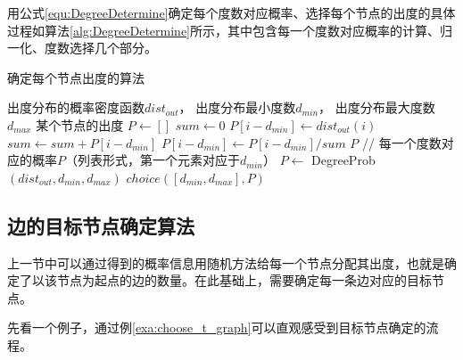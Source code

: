 用公式\ref{equ:DegreeDetermine}确定每个度数对应概率、选择每个节点的出度的具体过程如算法\ref{alg:DegreeDetermine}所示，其中包含每一个度数对应概率的计算、归一化、度数选择几个部分。

% 

\begin{algorithm}[htb]
  \caption{确定每个节点出度的算法}
  \label{alg:DegreeDetermine}
  \begin{algorithmic}[1]
    \Require
      出度分布的概率密度函数$dist_{out}$，
      出度分布最小度数$d_{min}$，
      出度分布最大度数$d_{max}$
    \Ensure 某个节点的出度
      \State $P \gets []$
      \State $sum \gets 0$
        \State $P[i - d_{min}] \gets dist_{out}(i)$
        \State $sum \gets sum + P[i - d_{min}]$
      \EndFor
        \State $P[i - d_{min}] \gets P[i - d_{min}] / sum$
      \EndFor
      \State \Return $P$ // 每一个度数对应的概率$P$（列表形式，第一个元素对应于$d_{min}$）
    \EndFunction
    \State $P \gets$ DegreeProb$(dist_{out}, d_{min}, d_{max})$
      \State \Return $choice([d_{min}, d_{max}], P)$
    \EndFunction
  \end{algorithmic}
\end{algorithm}

\subsection{边的目标节点确定算法}
\label{cha:DetermineTarget}

上一节中可以通过得到的概率信息用随机方法给每一个节点分配其出度，也就是确定了以该节点为起点的边的数量。在此基础上，需要确定每一条边对应的目标节点。

先看一个例子，通过例\ref{exa:choose_t_graph}可以直观感受到目标节点确定的流程。

